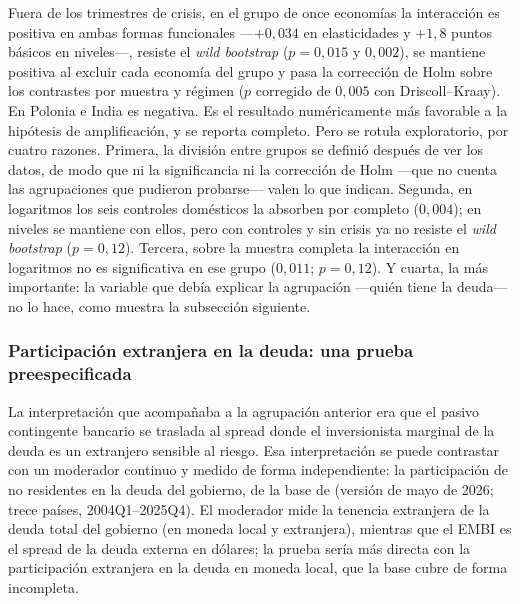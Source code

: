 Fuera de los trimestres de crisis, en el grupo de once economías la interacción es positiva en ambas formas funcionales ---$+0{,}034$ en elasticidades y $+1{,}8$ puntos básicos en niveles---, resiste el \textit{wild bootstrap} ($p=0{,}015$ y $0{,}002$), se mantiene positiva al excluir cada economía del grupo y pasa la corrección de Holm sobre los contrastes por muestra y régimen ($p$ corregido de $0{,}005$ con Driscoll--Kraay). En Polonia e India es negativa. Es el resultado numéricamente más favorable a la hipótesis de amplificación, y se reporta completo. Pero se rotula exploratorio, por cuatro razones. Primera, la división entre grupos se definió después de ver los datos, de modo que ni la significancia ni la corrección de Holm ---que no cuenta las agrupaciones que pudieron probarse--- valen lo que indican. Segunda, en logaritmos los seis controles domésticos la absorben por completo ($0{,}004$); en niveles se mantiene con ellos, pero con controles y sin crisis ya no resiste el \textit{wild bootstrap} ($p=0{,}12$). Tercera, sobre la muestra completa la interacción en logaritmos no es significativa en ese grupo ($0{,}011$; $p=0{,}12$). Y cuarta, la más importante: la variable que debía explicar la agrupación ---quién tiene la deuda--- no lo hace, como muestra la subsección siguiente.

\subsubsection{Participación extranjera en la deuda: una prueba preespecificada}
\label{sec:participacion-extranjera}

La interpretación que acompañaba a la agrupación anterior era que el pasivo contingente bancario se traslada al spread donde el inversionista marginal de la deuda es un extranjero sensible al riesgo. Esa interpretación se puede contrastar con un moderador continuo y medido de forma independiente: la participación de no residentes en la deuda del gobierno, de la base de \citet{ArslanalpTsuda2014} (versión de mayo de 2026; trece países, 2004Q1--2025Q4). El moderador mide la tenencia extranjera de la deuda total del gobierno (en moneda local y extranjera), mientras que el EMBI es el spread de la deuda externa en dólares; la prueba sería más directa con la participación extranjera en la deuda en moneda local, que la base cubre de forma incompleta.

